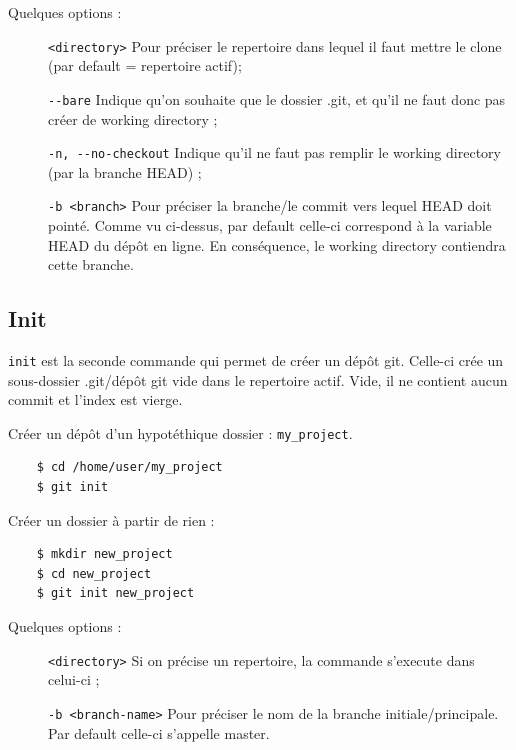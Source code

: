 \documentclass[a4paper, 12pt]{article}
\begin{document}
    Quelques options :
    \begin{description}
        \item[] \lstinline{<directory>} Pour préciser le repertoire dans lequel il
        faut mettre le clone (par default = repertoire actif); 
        \item[] \lstinline{--bare} Indique qu'on souhaite que le dossier .git, et
        qu'il ne faut donc pas créer de working directory ;
        \item[] \lstinline{-n, --no-checkout} Indique qu'il ne faut pas remplir
        le working directory (par la branche HEAD) ;
        \item[] \lstinline{-b <branch>} Pour préciser la branche/le commit vers
        lequel HEAD doit pointé. Comme vu ci-dessus, par default celle-ci
        correspond à la variable HEAD du dépôt en ligne. En conséquence, le
        working directory contiendra cette branche.
    \end{description}
   
    \subsection{Init}
    \lstinline{init} est la seconde commande qui permet de créer un dépôt git.
    Celle-ci crée un sous-dossier .git/dépôt git vide dans le repertoire actif.
    Vide, il ne contient aucun commit et l'index est vierge.

    \noindent Créer un dépôt d'un hypotéthique dossier :
    \lstinline{my_project}.

    \begin{lstlisting}
    $ cd /home/user/my_project
    $ git init
    \end{lstlisting}

    \noindent Créer un dossier à partir de rien :
    \begin{lstlisting}
    $ mkdir new_project
    $ cd new_project
    $ git init new_project
    \end{lstlisting}

    Quelques options :
    \begin{description}
        \item[] \lstinline{<directory>} Si on précise un repertoire, la commande 
        s'execute dans celui-ci ;
        \item[] \lstinline{-b <branch-name>} Pour préciser le nom de la branche
        initiale/principale. Par default celle-ci s'appelle master.
    \end{description}
\end{document}
